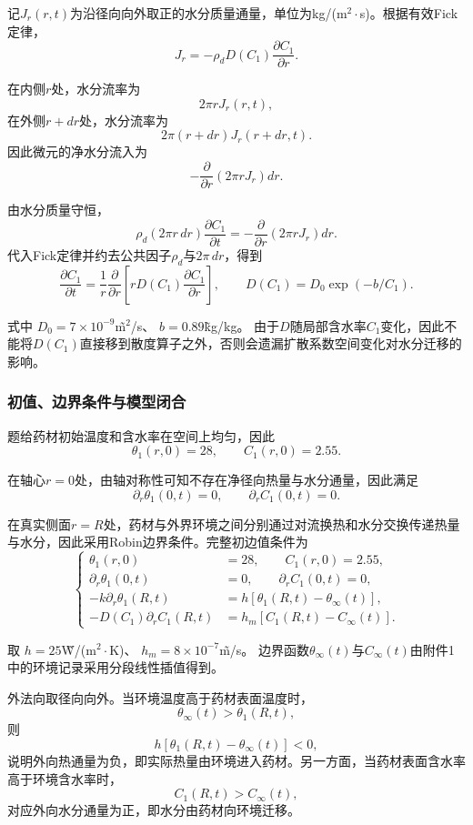 \documentclass[withoutpreface]{cumcmthesis}
\begin{document}
记$J_r(r,t)$为沿径向向外取正的水分质量通量，单位为kg/(m$^2\cdot$s)。根据有效Fick定律，
\[
J_r
=
-\rho_dD(C_1)
\frac{\partial C_1}{\partial r}.
\]

在内侧$r$处，水分流率为
\[
2\pi rJ_r(r,t),
\]
在外侧$r+dr$处，水分流率为
\[
2\pi(r+dr)J_r(r+dr,t).
\]
因此微元的净水分流入为
\[
-\frac{\partial}{\partial r}
\left(2\pi rJ_r\right)dr.
\]

由水分质量守恒，
\[
\rho_d(2\pi r\,dr)
\frac{\partial C_1}{\partial t}
=
-\frac{\partial}{\partial r}
\left(2\pi rJ_r\right)dr.
\]
代入Fick定律并约去公共因子$\rho_d$与$2\pi\,dr$，得到
\begin{equation}
\frac{\partial C_1}{\partial t}
=
\frac1r\frac{\partial}{\partial r}
\left[
rD(C_1)\frac{\partial C_1}{\partial r}
\right],
\qquad
D(C_1)=D_0\exp(-b/C_1).
\label{eq:moist1}
\end{equation}

式中
$D_0=7\times10^{-9}$\~m$^2$/s、
$b=0.89$\~kg/kg。
由于$D$随局部含水率$C_1$变化，因此不能将$D(C_1)$直接移到散度算子之外，否则会遗漏扩散系数空间变化对水分迁移的影响。
\subsubsection{初值、边界条件与模型闭合}

题给药材初始温度和含水率在空间上均匀，因此
\[
\theta_1(r,0)=28,
\qquad
C_1(r,0)=2.55.
\]

在轴心$r=0$处，由轴对称性可知不存在净径向热量与水分通量，因此满足
\[
\partial_r\theta_1(0,t)=0,
\qquad
\partial_rC_1(0,t)=0.
\]

在真实侧面$r=R$处，药材与外界环境之间分别通过对流换热和水分交换传递热量与水分，因此采用Robin边界条件。完整初边值条件为
\begin{equation}
\left\{
\begin{aligned}
\theta_1(r,0)&=28,
\qquad
C_1(r,0)=2.55,\\
\partial_r\theta_1(0,t)&=0,
\qquad
\partial_rC_1(0,t)=0,\\
-k\partial_r\theta_1(R,t)
&=
h[\theta_1(R,t)-\theta_\infty(t)],\\
-D(C_1)\partial_rC_1(R,t)
&=
h_m[C_1(R,t)-C_\infty(t)].
\end{aligned}
\right.
\label{eq:boundary1}
\end{equation}

取
$h=25$\~W/(m$^2\cdot$K)、
$h_m=8\times10^{-7}$\~m/s。
边界函数$\theta_\infty(t)$与$C_\infty(t)$由附件1中的环境记录采用分段线性插值得到。

外法向取径向向外。当环境温度高于药材表面温度时，
\[
\theta_\infty(t)>\theta_1(R,t),
\]
则
\[
h[\theta_1(R,t)-\theta_\infty(t)]<0,
\]
说明外向热通量为负，即实际热量由环境进入药材。另一方面，当药材表面含水率高于环境含水率时，
\[
C_1(R,t)>C_\infty(t),
\]
对应外向水分通量为正，即水分由药材向环境迁移。
\end{document}
